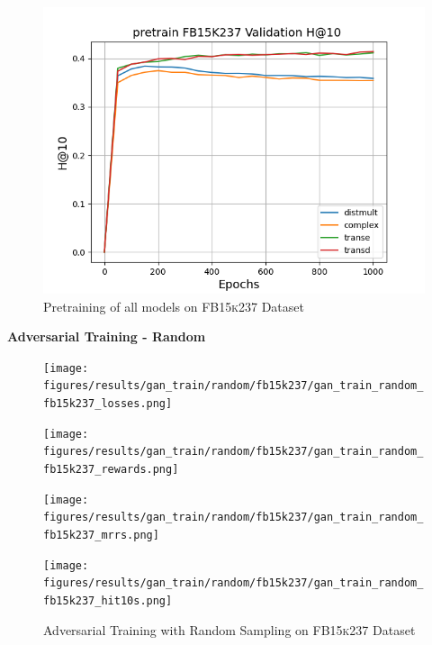 \begin{figure}
    \begin{minipage}{.3\textwidth}
      \centering
      \includegraphics[width=0.9\linewidth]{figures/results/pretrain/fb15k237/pretrain_fb15k237_hit10s.png}
    \end{minipage}%
    \caption{Pretraining of all models on \textsc{FB15k237} Dataset}
    \label{fig:test}
\end{figure}

\pagebreak

\textbf{Adversarial Training - Random}\\
\begin{figure}
    \centering
    \begin{minipage}{.5\textwidth}
      \centering
      \texttt{[image: figures/results/gan\_train/random/fb15k237/gan\_train\_random\_fb15k237\_losses.png]}
    \end{minipage}%
    \begin{minipage}{.5\textwidth}
      \centering
      \texttt{[image: figures/results/gan\_train/random/fb15k237/gan\_train\_random\_fb15k237\_rewards.png]}
    \end{minipage}
    \begin{minipage}{.5\textwidth}
      \centering
      \texttt{[image: figures/results/gan\_train/random/fb15k237/gan\_train\_random\_fb15k237\_mrrs.png]}
    \end{minipage}%
    \begin{minipage}{.5\textwidth}
      \centering
      \texttt{[image: figures/results/gan\_train/random/fb15k237/gan\_train\_random\_fb15k237\_hit10s.png]}
    \end{minipage}%
    \caption{Adversarial Training with Random Sampling on \textsc{FB15k237} Dataset}
    \label{fig:test}
\end{figure}

\pagebreak
